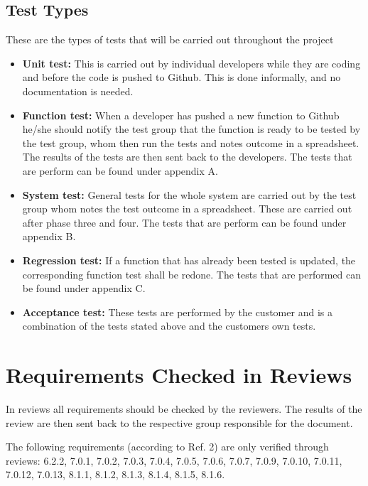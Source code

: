 \documentclass{article}
\begin{document}
		\subsection{Test Types}
		
These are the types of tests that will be carried out throughout the project


\begin{itemize}
  \item \textbf{Unit test:} This is carried out by individual developers while they are coding and before the code is pushed to Github. This is done informally, and no documentation is needed.
  
  \item \textbf{Function test:} When a developer has pushed a new function to Github he/she should notify the test group that the function is ready to be tested by the test group, whom then run the tests and notes outcome in a spreadsheet. The results of the tests are then sent back to the developers. The tests that are perform can be found under appendix A. 
  
   \item \textbf{System test:} General tests for the whole system are carried out by the test group whom notes the test outcome in a spreadsheet. These are carried out after phase three and four. The tests that are perform can be found under appendix B. 
   
      \item \textbf{Regression test:} If a function that has already been tested is updated, the corresponding function test shall be redone. The tests that are performed can be found under appendix C. 
      
         \item \textbf{Acceptance test:} These tests are performed by the customer and is a combination of the tests stated above and the customers own tests.
\end{itemize}


\section{Requirements Checked in Reviews}
In reviews all requirements should be checked by the reviewers. The results of the review are then sent back to the respective group responsible for the document.

The following requirements (according to Ref. 2) are only verified through
reviews: 6.2.2, 7.0.1, 7.0.2, 7.0.3, 7.0.4, 7.0.5, 7.0.6, 7.0.7, 7.0.9, 7.0.10, 7.0.11, 7.0.12, 7.0.13, 8.1.1, 8.1.2, 8.1.3, 8.1.4, 8.1.5, 8.1.6.
\end{document}
